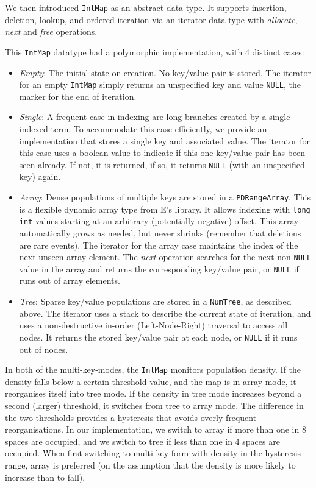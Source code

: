 \documentclass[]{ceurart}
\begin{document}
We then introduced \texttt{IntMap} as an abstract data type. It
supports insertion, deletion, lookup, and ordered iteration via an
iterator data type with \emph{allocate}, \emph{next} and \emph{free}
operations.

This \texttt{IntMap} datatype had a polymorphic implementation, with 4
distinct cases:
\begin{itemize}
\item \emph{Empty}: The initial state on creation. No key/value pair
  is stored. The iterator for an empty \texttt{IntMap} simply returns
  an unspecified key and value \texttt{NULL}, the marker for the end
  of iteration.
\item \emph{Single}: A frequent case in indexing are long branches
  created by a single indexed term. To accommodate this case
  efficiently, we provide an implementation that stores a single key
  and associated value. The iterator for this case uses a boolean value
  to indicate if this one key/value pair has been seen already. If
  not, it is returned, if so, it returns \texttt{NULL} (with an
  unspecified key) again.
\item \emph{Array}: Dense populations of multiple keys are stored in a
  \texttt{PDRangeArray}. This is a flexible dynamic array type from
  E's library. It allows indexing with \texttt{long int} values
  starting at an arbitrary (potentially negative) offset. This array
  automatically grows as needed, but never shrinks (remember that
  deletions are rare events). The iterator for the array case
  maintains the index of the next unseen array element. The
  \emph{next} operation searches for the next non-\texttt{NULL} value
  in the array and returns the corresponding key/value pair, or
  \texttt{NULL} if runs out of array elements.
\item \emph{Tree}: Sparse key/value populations are stored in a
  \texttt{NumTree}, as described above. The iterator uses a stack to
  describe the current state of iteration, and uses a non-destructive
  in-order (Left-Node-Right) traversal to access all nodes. It returns
  the stored key/value pair at each node, or \texttt{NULL} if it runs
  out of nodes.
\end{itemize}

In both of the multi-key-modes, the \texttt{IntMap} monitors
population density. If the density falls below a certain threshold
value, and the map is in array mode, it reorganises itself into tree
mode. If the density in tree mode increases beyond a second (larger)
threshold, it switches from tree to array mode. The difference in the
two thresholds provides a hysteresis that avoids overly frequent
reorganisations. In our implementation, we switch to array if more
than one in 8 spaces are occupied, and we switch to tree if less than
one in 4 spaces are occupied. When first switching to multi-key-form
with density in the hysteresis range, array is preferred (on the
assumption that the density is more likely to increase than to fall).
\end{document}
